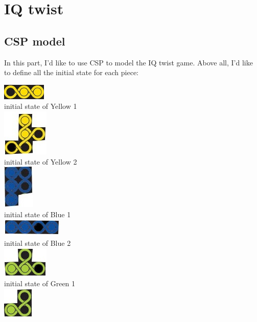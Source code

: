 \chapter{IQ twist}
\section{CSP model}
\newcommand{\VUnits} {\ensuremath{V_{units}}}
\newcommand{\VPegs} {\ensuremath{V_{pegs}}}
\newcommand{\Constraints}[2] {\ensuremath{C_{v_{#1},v_{#2}}}}
\newcommand{\Constraint}[1] {\ensuremath{C_{v_{#1}}}}
\newcommand{\Domain}[1] {\ensuremath{D(v_{#1})}}
\label{sec:CSP model}
In this part, I'd like to use CSP to model the IQ twist game. Above all, I'd like to define all the initial state for each piece:
\begin{center}
\includegraphics{yellow1.jpg} 
\\initial state of Yellow 1
\\\includegraphics{yellow2.jpg}
\\initial state of Yellow 2
\\\includegraphics{blue1.jpg}
\\initial state of Blue 1
\\\includegraphics{blue2.jpg}
\\initial state of Blue 2
\\\includegraphics{green1.jpg}
\\initial state of Green 1 
\\\includegraphics{green2.jpg}

\end{center}
